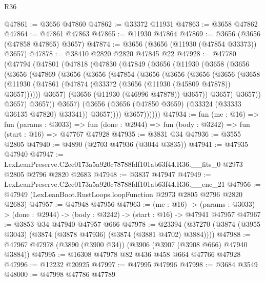 \begin{lexlean}{R36}
\begin{coremodule}
@47861 := @3656 @47860
@47862 := @33372 @11931
@47863 := @3658 @47862
@47864 := @47861 @47863
@47865 := @11930 @47864
@47869 := @3656 (@3656 (@47858 @47865) @3657)
@47874 := @3656 (@3656 (@11930 (@47854 @33373)) @3657)
@47878 := @38410 @2820 @2820 @47845 @22
@47928 := @47780
    (@47794
      (@47801
        (@47818
          (@47830
            (@47849
              (@3656
                (@11930
                  (@3658
                    (@3656
                      (@3656
                        (@47869
                          (@3656
                            (@3656
                              (@47854
                                (@3656
                                  (@3656
                                    (@3656
                                      (@3656
                                        (@3658
                                          (@11930
                                            (@47861
                                              (@47874
                                                (@33372 (@3656 (@11930 (@45809 @47878)) @3657))))))
                                        @3657)
                                      (@3656 (@11930 (@46996 @47878)) @3657))
                                    @3657)
                                  @3657))
                              @3657)
                            @3657))
                        @3657)
                      (@3656 (@3656 (@47850 @3659) (@33324 (@33333 @36135 @47820) @33341)) @3657))))
                @3657))))))
@47934 := fun (me : @16) =>
  fun (params : @3033) =>
  fun (done : @2944) => fun (body : @3242) => fun (start : @16) => @47767 @47928
@47935 := @3831 @34
@47936 := @3555 @2805
@47940 := @4890 (@2703 @47936 (@3044 @3835))
@47941 := @47935 @47940
@47947 := LexLeanPreserve.C2ee0173a5a920c78788fdf101ab63f44.R36.__fits_0
    @2973
    @2805
    @2796
    @2820
    @2683
@47948 := @3837 @47947
@47949 := LexLeanPreserve.C2ee0173a5a920c78788fdf101ab63f44.R36.__enc_21
@47956 := @47949 (LexLeanBoot.RustLoops.loopFunction @2973 @2805 @2796 @2820 @2683)
@47957 := @47948 @47956
@47963 := (me : @16) ->
  (params : @3033) -> (done : @2944) -> (body : @3242) -> (start : @16) -> @47941 @47957
@47967 := @3853 @34 @47940 @47957 @666
@47978 := @23394 (@37270 (@3874 (@3955 @3043) (@3874 (@3878 @47936) (@3874 (@3881 @4702) @3884))))
@47988 := @47967 @47978 (@3890 (@3900 @34)) (@3906 (@3907 (@3908 @666) @47940 @3884))
@47995 := @16308 @47978 @82 @436 @458 @664 @47766 @47928
@47996 := @12232 @20925
@47997 := @47995 @47996
@47998 := @3684 @3549
@48000 := @47998 @47786 @47789

\end{coremodule}
\end{lexlean}
